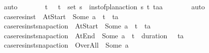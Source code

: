 \begin{isabellebody}
\ auto\isanewline
\ \ \ \ \isamarkupfalse%
\ \isamarkupfalse%
\ t\isactrlsub {\isasympi}\ {\isasympi}\ \ {\isachardoublequoteopen}{\isacharparenleft}{\kern0pt}t\isactrlsub {\isasympi}{\isacharcomma}{\kern0pt}{\isasympi}{\isacharparenright}{\kern0pt}\ {\isasymin}\ set\ {\isasympi}s{\isachardoublequoteclose}\ \ {\isachardoublequoteopen}inst{\isacharunderscore}{\kern0pt}of{\isacharunderscore}{\kern0pt}plan{\isacharunderscore}{\kern0pt}action\ {\isasympi}s\ {\isacharparenleft}{\kern0pt}t\isactrlsub {\isasympi}{\isacharcomma}{\kern0pt}{\isasympi}{\isacharparenright}{\kern0pt}\ {\isacharparenleft}{\kern0pt}t\isactrlsub a{\isacharcomma}{\kern0pt}a{\isacharparenright}{\kern0pt}{\isachardoublequoteclose}\isanewline
\ \ \ \ \ \ \isamarkupfalse%
\ auto\isanewline
\ \ \ \ \isamarkupfalse%
\ {\isacharquery}{\kern0pt}case{}{\isacharequal}{\kern0pt}{\isachardoublequoteopen}res{\isacharunderscore}{\kern0pt}inst\ {\isasympi}\ At{\isacharunderscore}{\kern0pt}Start\ {\isacharequal}{\kern0pt}\ Some\ a\ {\isasymand}\ t\isactrlsub {\isasympi}\ {\isacharequal}{\kern0pt}\ t\isactrlsub a{\isachardoublequoteclose}\isanewline
\ \ \ \ \isamarkupfalse%
\ {\isacharquery}{\kern0pt}case{}{\isacharequal}{\kern0pt}{\isachardoublequoteopen}res{\isacharunderscore}{\kern0pt}inst{\isacharunderscore}{\kern0pt}snap{\isacharunderscore}{\kern0pt}action\ {\isasympi}\ At{\isacharunderscore}{\kern0pt}Start\ {\isacharequal}{\kern0pt}\ Some\ a\ {\isasymand}\ t\isactrlsub {\isasympi}\ {\isacharequal}{\kern0pt}\ t\isactrlsub a{\isachardoublequoteclose}\isanewline
\ \ \ \ \isamarkupfalse%
\ {\isacharquery}{\kern0pt}case{}{\isacharequal}{\kern0pt}{\isachardoublequoteopen}res{\isacharunderscore}{\kern0pt}inst{\isacharunderscore}{\kern0pt}snap{\isacharunderscore}{\kern0pt}action\ {\isasympi}\ At{\isacharunderscore}{\kern0pt}End\ {\isacharequal}{\kern0pt}\ Some\ a\ {\isasymand}\ t\isactrlsub {\isasympi}\ {\isacharplus}{\kern0pt}\ {\isacharparenleft}{\kern0pt}duration\ {\isasympi}{\isacharparenright}{\kern0pt}\ {\isacharequal}{\kern0pt}\ t\isactrlsub a{\isachardoublequoteclose}\isanewline
\ \ \ \ \isamarkupfalse%
\ {\isacharquery}{\kern0pt}case{}{\isacharequal}{\kern0pt}{\isachardoublequoteopen}res{\isacharunderscore}{\kern0pt}inst{\isacharunderscore}{\kern0pt}snap{\isacharunderscore}{\kern0pt}action\ {\isasympi}\ Over{\isacharunderscore}{\kern0pt}All\ {\isacharequal}{\kern0pt}\ Some\ a\ {\isasymand}\ \isanewline

\end{isabellebody}
